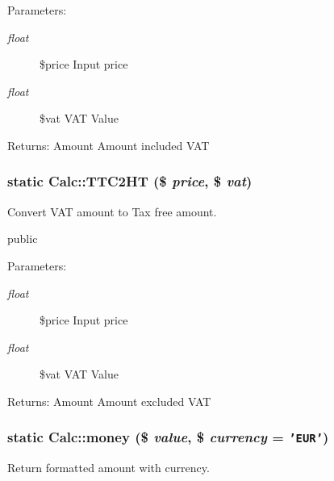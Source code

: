 \begin{Desc}
\item[Parameters:]
\begin{description}
\item[{\em float}]\$price Input price \item[{\em float}]\$vat VAT Value \end{description}
\end{Desc}
\begin{Desc}
\item[Returns:]Amount Amount included VAT \end{Desc}
\hypertarget{classCalc_5fd87cac52c2cc34fb22fcb732f5ee21}{
\subsubsection[TTC2HT]{\setlength{\rightskip}{0pt plus 5cm}static Calc::TTC2HT (\$ {\em price}, \/  \$ {\em vat})}}
\label{classCalc_5fd87cac52c2cc34fb22fcb732f5ee21}


Convert VAT amount to Tax free amount.

public

\begin{Desc}
\item[Parameters:]
\begin{description}
\item[{\em float}]\$price Input price \item[{\em float}]\$vat VAT Value \end{description}
\end{Desc}
\begin{Desc}
\item[Returns:]Amount Amount excluded VAT \end{Desc}
\hypertarget{classCalc_6e330532dcf40889cc96f09dcdcba7b4}{
\subsubsection[money]{\setlength{\rightskip}{0pt plus 5cm}static Calc::money (\$ {\em value}, \/  \$ {\em currency} = {\tt 'EUR'})}}
\label{classCalc_6e330532dcf40889cc96f09dcdcba7b4}


Return formatted amount with currency.

